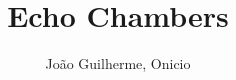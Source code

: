 \title{Echo Chambers}

\author{João Guilherme, Onicio}


\address{CESAR School
\nextinstitute
  pegar a facul de onicio
}